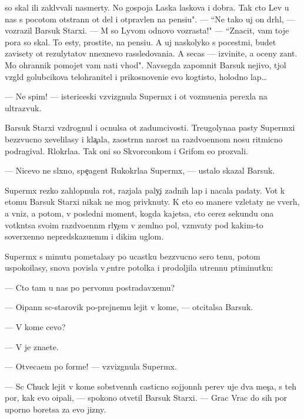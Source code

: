 \documentclass[12pt]{book}
\begin{document}
so skal{\yi} ili zakl{\e}v{\yi}vali nasmerty. No gospoja Laska laskova i dobra. Tak cto Lev u nas s pocotom otstran{\e}n ot del i otpravlen na pensi{\y}u". — ``Ne tako{\y} uj on dr{\ia}hl{\yi}{\y}, — vozrazil Barsuk Starxi{\y}. — M{\yi} so Lyvom odnovo vozrasta!" — ``Znacit, vam toje pora so skal{\yi}. To {\y}esty, prostite, na pensi{\y}u. A uj naskolyko s pocest{\ia}mi, budet zavisety ot rezulytatov n{\yi}nexnevo rassledovani{\y}a. A se{\y}cas — izvinite, {\y}a oceny zan{\ia}t. Mo{\y} ohrannik pomojet vam na{\y}ti v{\yi}hod". Navsegda zapomnit Barsuk nejivo{\y}, t{\ia}jol{\yi}{\y} vzgl{\ia}d golubcikova telohranitel{\ia} i prikosnoveni{\y}e {\y}evo kogtisto{\y}, holodno{\y} lap{\yi}…

— Ne spim! — istericeski vzvizgnula Superm{\yi}x i ot vozmu{\x}eni{\y}a perexla na ultrazvuk.

Barsuk Starxi{\y} vzdrognul i ocnulsa ot zadumcivosti. Treugolyna{\y}a pasty Superm{\yi}xi bezzvucno xevelilasy i kla{\c}ala, zaostr{\e}nn{\yi}{\y} narost na razdvo{\y}ennom nosu ritmicno podragival. R{\yi}lokr{\yi}la{\y}a. Tak oni so Skvorconkom i Grifom {\y}e{\y}o prozvali.

— Nicevo ne sl{\yi}xno, spe{\c}agent Rukokr{\yi}la{\y}a Superm{\yi}x, — ustalo skazal Barsuk.

Superm{\yi}x rezko zahlopnula rot, razjala paly{\c}i zadnih lap i nacala padaty. Vot k etomu Barsuk Starxi{\y} nikak ne mog priv{\yi}knuty. K eto{\y} {\y}e{\y}o manere vzletaty ne vverh, a vniz, a potom, v posledni{\y} moment, kogda kajetsa, cto cerez sekundu ona votkn{\e}tsa svo{\y}im razdvo{\y}enn{\yi}m r{\yi}ly{\c}em v zeml{\ia}no{\y} pol, vzm{\yi}vaty pod kakim-to soverxenno nepredskazu{\y}em{\yi}m i dikim uglom.

Superm{\yi}x s minutu pometalasy po ucastku bezzvucno{\y} sero{\y} ten{\y}u, potom uspoko{\y}ilasy, snova povisla v {\c}entre potolka i prodoljila utrenn{\io}{\y}u p{\ia}\-ti\-mi\-nut\-ku:

— Cto tam u nas po pervomu postradavxemu?

— O{\x}ipann{\yi}{\y} s{\yi}c-star{\y}ov{\x}ik po-prejnemu lejit v kome, — otcitalsa Barsuk.

— V kome cevo?

— V{\yi} je zna{\y}ete.

— Otveca{\y}em po forme! — vzvizgnula Superm{\yi}x.

— S{\yi}c Chuck lejit v kome sobstvenn{\yi}h casticno sojjonn{\yi}h per{\y}ev uje dva mes{\ia}{\c}a, s teh por, kak {\y}evo o{\x}ipali, — spo\-ko{\y}\-no otvetil Barsuk Starxi{\y}. — Grac Vrac do sih por uporno boretsa za {\y}evo jizny.
\end{document}
